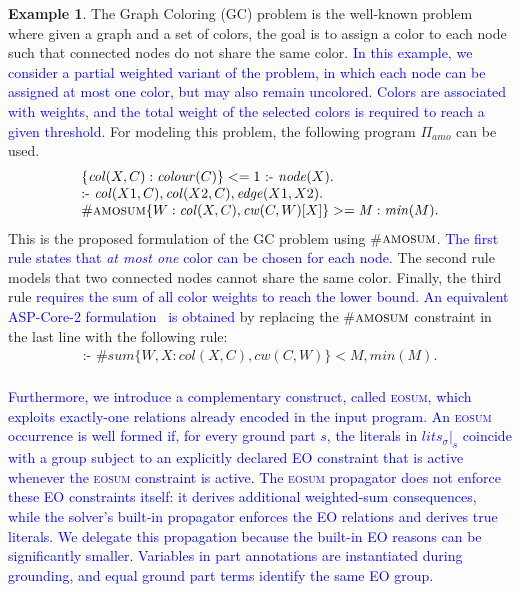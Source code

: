 \documentclass[preprint,authoryear]{elsarticle}
\theoremstyle{definition}
\newtheorem{example}{Example}[section]
\def\amosum{\ensuremath{\textsc{amosum}}\xspace}
\begin{document}
\begin{example}
    \label{ex:kr:1}
    The Graph Coloring (GC) problem is the well-known problem where given a graph and a set of colors, the goal is to assign a color to each node such that connected nodes do not share the same color.
    \textcolor{blue}{In this example, we consider a partial weighted variant of the problem, in which each node can be assigned at most one color, but may also remain uncolored. Colors are associated with weights, and the total weight of the selected colors is required to reach a given threshold.}
    For modeling this problem, the following program $\Pi_\mathit{amo}$ can be used.
    $$\begin{array}{l}
        \{\mathit{col}(X,C) : \mathit{colour}(C)\} <= 1 \text{ :- } \mathit{node}(X). \\ 
        \text{:- } \mathit{col}(X1,C), \mathit{col}(X2,C), \mathit{edge}(X1,X2). \\
        \#\amosum\{ W: \mathit{col}(X,C), \mathit{cw}(C,W) [X]\} >= \mathit{M} : \mathit{min}(M). \\
    \end{array}$$
    This is the proposed formulation of the GC problem using \#\amosum.
    \textcolor{blue}{The first rule states that \textit{at most one} color can be chosen for each node.}
    The second rule models that two connected nodes cannot share the same color.
    Finally, the third rule \textcolor{blue}{requires the sum of all color weights to reach the lower bound. An equivalent ASP-Core-2 formulation~\citep{DBLP:journals/tplp/CalimeriFGIKKLM20} is obtained} by replacing the \#\amosum constraint in the last line with the following rule:
    $$\begin{array}{l}
        \text{:- } \#\mathit{sum}\{ W, X: \mathit{col}(X,C), \mathit{cw}(C,W)\} < \mathit{M} , \mathit{min}(M). \\
    \end{array}$$
\end{example}

\textcolor{blue}{Furthermore, we introduce a complementary construct, called \textsc{eosum}, which exploits exactly-one relations already encoded in the input program. An \textsc{eosum} occurrence is well formed if, for every ground part $s$, the literals in $\mathit{lits}_\sigma|_s$ coincide with a group subject to an explicitly declared EO constraint that is active whenever the \textsc{eosum} constraint is active. The \textsc{eosum} propagator does not enforce these EO constraints itself: it derives additional weighted-sum consequences, while the solver's built-in propagator enforces the EO relations and derives true literals. We delegate this propagation because the built-in EO reasons can be significantly smaller. Variables in part annotations are instantiated during grounding, and equal ground part terms identify the same EO group.}
\end{document}
